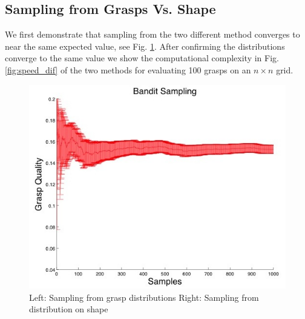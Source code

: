\documentclass[letterpaper, 10 pt, conference]{ieeeconf}  %
\begin{document}
\subsection{Sampling from Grasps Vs. Shape}
We first demonstrate that sampling from the two different method converges to near the same expected value, see Fig. \ref{fig:sampling_convergence}. After confirming the distributions converge to the same value we show the computational complexity in Fig. \ref{fig:speed_dif} of the two methods for evaluating 100 grasps on an $n \times n$ grid. 

\begin{figure}[ht!]
\centering
\includegraphics[scale = 0.3]{figures/Slide11.jpg}
\caption{Left: Sampling from grasp distributions
Right: Sampling from distribution on shape}
\vspace*{-10pt}
\label{fig:sampling_convergence}
\end{figure}
\end{document}
